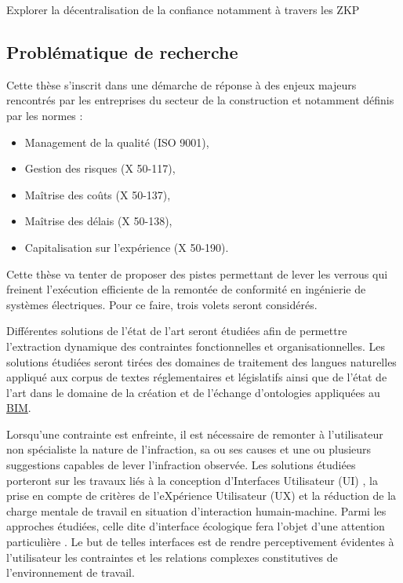 \documentclass[a4paper,12pt]{article}
\begin{document}
Explorer la décentralisation de la confiance notamment à travers les ZKP
\subsection{Problématique de recherche}
\label{sec:orgeb53cb4}
Cette thèse s'inscrit dans une démarche de réponse à des enjeux majeurs rencontrés par les entreprises du secteur de la construction \autocite{guillouSegmentationDansEntreprises2003b} et notamment définis par les normes :
\begin{itemize}
\item Management de la qualité (ISO 9001),
\item Gestion des risques (X 50-117),
\item Maîtrise des coûts (X 50-137),
\item Maîtrise des délais (X 50-138),
\item Capitalisation sur l'expérience (X 50-190).
\end{itemize}

Cette thèse va tenter de proposer des pistes permettant de lever les verrous qui freinent l'exécution efficiente de la remontée de conformité en ingénierie de systèmes électriques. Pour ce faire, trois volets seront considérés.

Différentes solutions de l'état de l'art seront étudiées afin de permettre l'extraction dynamique des contraintes fonctionnelles et organisationnelles. Les solutions étudiées seront tirées des domaines de traitement des langues naturelles appliqué aux corpus de textes réglementaires et législatifs ainsi que de l'état de l'art dans le domaine de la création et de l'échange d'ontologies appliquées au \protect\hyperlink{gls-1}{\label{gls-1-use-11}BIM}.

Lorsqu'une contrainte est enfreinte, il est nécessaire de remonter à l'utilisateur non spécialiste la nature de l'infraction, sa ou ses causes et une ou plusieurs suggestions capables de lever l'infraction observée. Les solutions étudiées porteront sur les travaux liés à la conception d'Interfaces Utilisateur (UI) \autocite{Shneiderman2016}, la prise en compte de critères de l'eXpérience Utilisateur (UX) \autocite{Nogier2020} et la réduction de la charge mentale de travail \autocite{longoHumanMentalWorkload2022a,morayMentalWorkloadIts1979a} en situation d'interaction humain-machine. 
Parmi les approches étudiées, celle dite  d'interface écologique fera l'objet d'une attention particulière \autocite{vicenteEcologicalInterfaceDesign1992b,Burns2004}. Le but de telles interfaces est de rendre perceptivement évidentes à l'utilisateur les contraintes et les relations complexes constitutives de l'environnement de travail.
\end{document}
